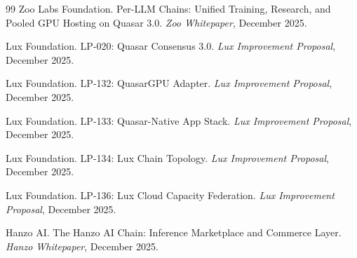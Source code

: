 \begin{thebibliography}{99}
Zoo Labs Foundation.
\newblock Per-LLM Chains: Unified Training, Research, and Pooled GPU Hosting on Quasar 3.0.
\newblock \emph{Zoo Whitepaper}, December 2025.

Lux Foundation.
\newblock LP-020: Quasar Consensus 3.0.
\newblock \emph{Lux Improvement Proposal}, December 2025.

Lux Foundation.
\newblock LP-132: QuasarGPU Adapter.
\newblock \emph{Lux Improvement Proposal}, December 2025.

Lux Foundation.
\newblock LP-133: Quasar-Native App Stack.
\newblock \emph{Lux Improvement Proposal}, December 2025.

Lux Foundation.
\newblock LP-134: Lux Chain Topology.
\newblock \emph{Lux Improvement Proposal}, December 2025.

Lux Foundation.
\newblock LP-136: Lux Cloud Capacity Federation.
\newblock \emph{Lux Improvement Proposal}, December 2025.

Hanzo AI.
\newblock The Hanzo AI Chain: Inference Marketplace and Commerce Layer.
\newblock \emph{Hanzo Whitepaper}, December 2025.

\end{thebibliography}

